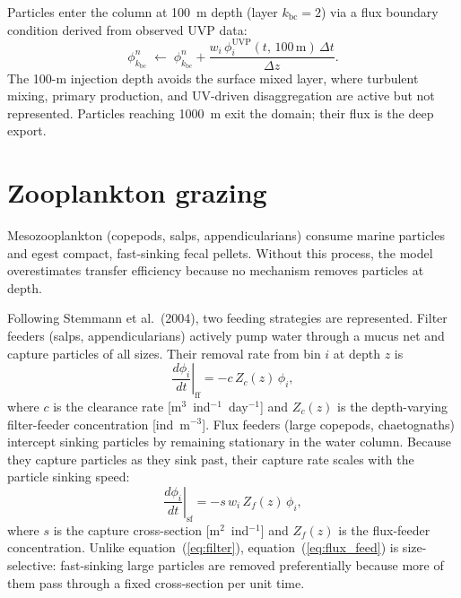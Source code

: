 \documentclass[12pt,a4paper]{report}
\numberwithin{equation}{chapter}
\begin{document}
Particles enter the column at 100~m depth (layer $k_\mathrm{bc} = 2$)
via a flux boundary condition derived from observed UVP data:
\begin{equation}
    \phi_{k_\mathrm{bc}}^n
    \;\leftarrow\;
    \phi_{k_\mathrm{bc}}^n
    + \frac{w_i\,\phi_i^\mathrm{UVP}(t,\,100\,\mathrm{m})\,\Delta t}{\Delta z}.
    \label{eq:flux_bc}
\end{equation}
The 100-m injection depth avoids the surface mixed layer, where turbulent
mixing, primary production, and UV-driven disaggregation are active but
not represented. Particles reaching 1000~m exit the domain; their flux
is the deep export.

\section{Zooplankton grazing}

Mesozooplankton (copepods, salps, appendicularians) consume marine particles
and egest compact, fast-sinking fecal pellets. Without this process, the model
overestimates transfer efficiency because no mechanism removes particles at
depth.

Following Stemmann et al.\ (2004), two feeding strategies are represented.
Filter feeders (salps, appendicularians) actively pump water through a
mucus net and capture particles of all sizes. Their removal rate from bin
$i$ at depth $z$ is
\begin{equation}
    \left.\frac{d\phi_i}{dt}\right|_\mathrm{ff}
    = -c\,Z_c(z)\,\phi_i,
    \label{eq:filter}
\end{equation}
where $c$ is the clearance rate [m$^3$~ind$^{-1}$~day$^{-1}$] and
$Z_c(z)$ is the depth-varying filter-feeder concentration [ind~m$^{-3}$].
Flux feeders (large copepods, chaetognaths) intercept sinking particles
by remaining stationary in the water column. Because they capture particles
as they sink past, their capture rate scales with the particle sinking speed:
\begin{equation}
    \left.\frac{d\phi_i}{dt}\right|_\mathrm{sf}
    = -s\,w_i\,Z_f(z)\,\phi_i,
    \label{eq:flux_feed}
\end{equation}
where $s$ is the capture cross-section [m$^2$~ind$^{-1}$] and $Z_f(z)$
is the flux-feeder concentration. Unlike equation~(\ref{eq:filter}),
equation~(\ref{eq:flux_feed}) is size-selective: fast-sinking large particles
are removed preferentially because more of them pass through a fixed
cross-section per unit time.
\end{document}
